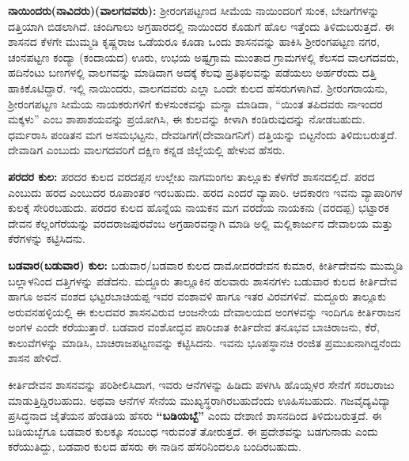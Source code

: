 \textbf{ನಾಯಿಂದರು(ನಾವಿದರು)(ವಾಲಗದವರು):} ಶ‍್ರೀರಂಗಪಟ್ಟಣದ ಸೀಮೆಯ ನಾಯಿಂದರಿಗೆ ಸುಂಕ, ಬೇಡಿಗೆಗಳನ್ನು ದತ್ತಿಯಾಗಿ ಬಿಡಲಾಗಿದೆ. ಚಂದಿಗಾಲು ಅಗ್ರಹಾರದಲ್ಲಿ ನಾಯಿಂದರ ಕೊಡುಗೆ ಹೊಲ ಇತ್ತೆಂದು ತಿಳಿದುಬರುತ್ತದೆ. ಈ ಶಾಸನದ ಕೆಳಗೇ ಮುಮ್ಮಡಿ ಕೃಷ್ಣರಾಜ ಒಡೆಯರೂ ಕೂಡಾ ಒಂದು ಶಾಸನವನ್ನು ಹಾಕಿಸಿ ಶ‍್ರೀರಂಗಪಟ್ಟಣ ನಗರ, ಚಂನಪಟ್ಟಣ ಕಂದ್ಯಾ (ಕಂದಾಯದ) ಊರು, ಉಭಯ ಅಷ್ಟಗ್ರಾಮ ಮುಂತಾದ ಗ್ರಾಮಗಳಲ್ಲಿ ಕೆಲಸದ ವಾಲಗದವರು, ಹದಿನೆಂಟು ಬಣಗಳಲ್ಲಿ ವಾಲಗವನ್ನು ಮಾಡಿದಾಗ ಅದಕ್ಕೆ ಕೆಲವು ಪ್ರತಿಫಲವನ್ನು ಪಡೆಯಲು ಅರ್ಹರೆಂದು ದತ್ತಿ ಹಾಕಿಕೊಟಿ\-ದ್ದಾರೆ. ಇಲ್ಲಿ ನಾಯಿಂದರು, ವಾಲಗದವರು ಎಲ್ಲಾ ಒಂದೇ ಕುಲದ ಹೆಸರುಗಳಾಗಿವೆ. ಶ‍್ರೀರಂಗರಾಯನು, ಶ‍್ರೀರಂಗಪಟ್ಟಣ ಸೀಮೆಯ ನಾಯಕರುಗಳಿಗೆ ಕುಳಸುಂಕವನ್ನು ಮನ್ನಾ ಮಾಡಿದಾ, “ಯಿಂತ ತಪಿದವರು ನಾಇಂದರ ಮಕ್ಕಳು” ಎಂಬ ಶಾಪಾಶಯವನ್ನು ಪ್ರಯೋಗಿಸಿ, ಈ ಕುಲವನ್ನು ಕೀಳಾಗಿ ಕಂಡಿರುವುದನ್ನು ನೋಡಬಹುದು. ಧರ್ಮರಾಸಿ ಪಂಡಿತನ ಮಗ ಅಸಮಭಟ್ಟನು, ದೇವಡಿಗಗೆ(ದೇವಾಡಿಗನಿಗೆ) ದತ್ತಿಯನ್ನು ಬಿಟ್ಟನೆಂದು ತಿಳಿದುಬರುತ್ತದೆ. ದೇವಾಡಿಗ ಎಂಬುದು ವಾಲಗದವರಿಗೆ ದಕ್ಷಿಣ ಕನ್ನಡ ಜಿಲ್ಲೆಯಲ್ಲಿ ಹೇಳುವ ಹೆಸರು.

\textbf{ಪರದರ ಕುಲ:} ಪರದರ ಕುಲದ ವರದಪ್ಪನ ಉಲ್ಲೇಖ ನಾಗಮಂಗಲ ತಾಲ್ಲೂಕು ಕೆಳಗೆರೆ ಶಾಸನದಲ್ಲಿದೆ. ಪರದ ಎಂಬುದು ಹರದ ಎಂಬುದರ ರೂಪಾಂತರ ಇರಬಹುದು. ಹರದ ಎಂದರೆ ವ್ಯಾಪಾರಿ. ಆದಕಾರಣ ಇವನು ವ್ಯಾಪಾರಿಗಳ ಕುಲಕ್ಕೆ ಸೇರಿರಬಹುದು. ಪರದರ ಕುಲದ ಹೊನ್ನೆಯ ನಾಯಕನ ಮಗ ವರದೆಯ ನಾಯಕನು (ವರದಪ್ಪ) ಭಟ್ಟಾರಕ ದೇವನ ಕೆಲ್ಲಂಗೆರೆಯನ್ನು ವರದರಾಜಪುರವೆಂಬ ಅಗ್ರಹಾರವನ್ನಾಗಿ ಮಾಡಿ ಅಲ್ಲಿ ಮಲ್ಲಿಕಾರ್ಜುನ ದೇವಾಲಯ ಮತ್ತು ಕೆರೆಗಳನ್ನು ಕಟ್ಟಿಸಿದನು.

\textbf{ಬಡವಾರ(ಬಡುವಾರ) ಕುಲ: } ಬಡುವಾರ/ಬಡವಾರ ಕುಲದ ದಾಮೋದರದೇವನ ಕುಮಾರ, ಕೀರ್ತಿದೇವನು ಮುಮ್ಮಡಿ ಬಲ್ಲಾಳನಿಂದ ದತ್ತಿಗಳನ್ನು ಪಡೆದನು. ಮದ್ದೂರು ತಾಲ್ಲೂಕಿನ ಹಲವಾರು ಶಾಸನಗಳು ಬಡುವಾರ ಕುಲದ ಕೀರ್ತಿದೇವ ಹಾಗೂ ಅವನ ವಂಶದ ಭಟ್ಟರಬಾಚಿಯಪ್ಪ ಇವರ ವಂಶಾವಳಿ ಹಾಗೂ ಇತರ ವಿರವಗಳಿವೆ. ಮದ್ದೂರು ತಾಲ್ಲೂಕು ಅರುವನಹಳ್ಳಿಯಲ್ಲಿ ಈ ಕುಲದವರ ಶಾಸನವಿರುವ ಆಂಜನೇಯ ದೇವಾಲಯದ ಅಂಗಳವನ್ನು ಇಂದಿಗೂ ಕೀರ್ತಿರಾಜನ ಅಂಗಳ ಎಂದೇ ಕರೆಯುತ್ತಾರೆ. ಬಡವಾರ ವಂಶೋದ್ಭವ ಪಾರಿಜಾತ ಕೀರ್ತಿದೇವ ತನೂಭವ ಬಾಚಿರಾಜನು, ಕೆರೆ, ಕಾಲುವೆಗಳನ್ನು ಮಾಡಿಸಿ, ಬಾಚಿರಾಜಪಟ್ಟಣವನ್ನು ಕಟ್ಟಿಸಿದನು. ಇವನು ಭೂಪಸ್ಥಾನಚಿ ರಂಜಿತ ಪ್ರಮುಖನಾಗಿದ್ದನೆಂದು ಶಾಸನ ಹೇಳಿದೆ.

ಕೀರ್ತಿದೇವನ ಶಾಸನವನ್ನು ಪರಿಶೀಲಿಸಿದಾಗ, ಇವರು ಆನೆಗಳನ್ನು ಹಿಡಿದು ಪಳಗಿಸಿ ಹೊಯ್ಸಳರ ಸೇನೆಗೆ ಸರಬರಾಜು ಮಾಡುತ್ತಿದ್ದಿರಬಹುದು. ಅಥವಾ ಆನೆಗಳ ಸೇನೆಯ ಮುಖ್ಯಸ್ಥರಾಗಿರಬಹುದೆಂದು ಊಹಿಸಬಹುದು. ಗಜವೈದ್ಯವಿದ್ಯಾ ಪ್ರಸಿದ್ಧನಾದ ಜೈತೆಯನ ಹೆಂಡತಿಯ ಹೆಸರು \textbf{“ಬಡಿಯಬ್ಬೆ”} ಎಂದು ದೇಶಾಣಿ ಶಾಸನದಿಂದ ತಿಳಿದುಬರುತ್ತದೆ. ಈ ಬಡಿಯಬ್ಬೆಗೂ ಬಡವಾರ ಕುಲಕ್ಕೂ ಸಂಬಂಧ ಇರುವಂತೆ ತೋರುತ್ತದೆ. ಈ ಪ್ರದೇಶವನ್ನು ಬಡಗುನಾಡು ಎಂದು ಕರೆಯುತಿದ್ದು, ಬಡವಾರ ಕುಲದ ಹೆಸರು ಈ ನಾಡಿನ ಹೆಸರಿನಿಂದಲೂ ಬಂದಿರಬಹುದು.

